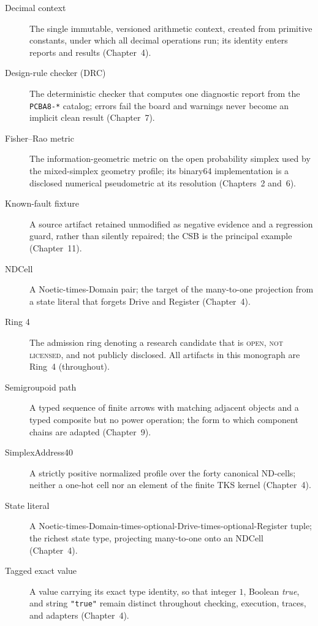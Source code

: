 \begin{description}
\item[Decimal context] The single immutable, versioned arithmetic context,
created from primitive constants, under which all decimal operations run; its
identity enters reports and results (Chapter~4).

\item[Design-rule checker (DRC)] The deterministic checker that computes one
diagnostic report from the \texttt{PCBA8-*} catalog; errors fail the board and
warnings never become an implicit clean result (Chapter~7).

\item[Fisher--Rao metric] The information-geometric metric on the open
probability simplex used by the mixed-simplex geometry profile; its binary64
implementation is a disclosed numerical pseudometric at its resolution
(Chapters~2 and~6).

\item[Known-fault fixture] A source artifact retained unmodified as negative
evidence and a regression guard, rather than silently repaired; the CSB is the
principal example (Chapter~11).

\item[NDCell] A Noetic-times-Domain pair; the target of the many-to-one
projection from a state literal that forgets Drive and Register (Chapter~4).

\item[Ring 4] The admission ring denoting a research candidate that is
\textsc{open}, \textsc{not licensed}, and not publicly disclosed. All artifacts
in this monograph are Ring~4 (throughout).

\item[Semigroupoid path] A typed sequence of finite arrows with matching adjacent
objects and a typed composite but no power operation; the form to which component
chains are adapted (Chapter~9).

\item[SimplexAddress40] A strictly positive normalized profile over the forty
canonical ND-cells; neither a one-hot cell nor an element of the finite TKS
kernel (Chapter~4).

\item[State literal] A Noetic-times-Domain-times-optional-Drive-times-optional-Register
tuple; the richest state type, projecting many-to-one onto an NDCell
(Chapter~4).

\item[Tagged exact value] A value carrying its exact type identity, so that
integer $1$, Boolean \emph{true}, and string \texttt{"true"} remain distinct
throughout checking, execution, traces, and adapters (Chapter~4).


\end{description}
